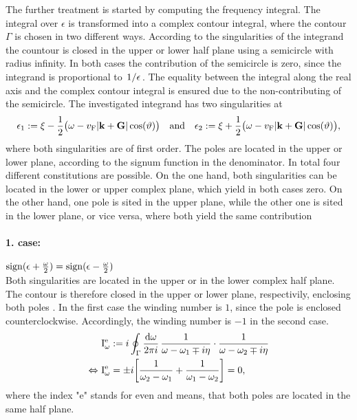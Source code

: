 The further treatment is started by computing the frequency integral.
The integral over $\epsilon$ is transformed into a complex contour integral, where the contour $\Gamma$ is chosen in two different ways.
According to the singularities of the integrand the countour is closed in the upper or lower half plane using a semicircle with radius infinity.
In both cases the contribution of the semicircle is zero, since the integrand is proportional to $\flatfrac{1}{\epsilon}$.
The equality between the integral along the real axis and the complex contour integral is ensured due to the non-contributing of the semicircle.
The investigated integrand has two singularities at
%
\begin{align}
	\epsilon_{1} := \xi - \frac{1}{2}\big(\omega - v_{\mt{F}} |\vb{k} + \vb{G}| \cos(\vartheta)\big) 
	\qq{and}
	\epsilon_{2} := \xi + \frac{1}{2}\big(\omega - v_{\mt{F}} |\vb{k} + \vb{G}| \cos(\vartheta)\big),
\end{align}
%
where both singularities are of first order.
The poles are located in the upper or lower plane, according to the signum function in the denominator.
In total four different constitutions are possible.
On the one hand, both singularities can be located in the lower or upper complex plane, which yield in both cases zero.
On the other hand, one pole is sited in the upper plane, while the other one is sited in the lower plane, or vice versa, where both yield the same contribution
%
\paragraph{1. case:} $\operatorname{sign}(\epsilon + \frac{\omega}{2}) = \operatorname{sign}(\epsilon - \frac{\omega}{2})$\\
%
Both singularities are located in the upper or in the lower complex half plane.
The contour is therefore closed in the upper or lower plane, respectivily, enclosing both poles .
In the first case the winding number is $1$, since the pole is enclosed counterclockwise.
Accordingly, the winding number is $-1$ in the second case.
%
\begin{align}
	&\mathrm{I}_{\omega}^{\mathrm{e}} := i \oint_{\Gamma} \frac{\dd{\omega}}{2\pi i}\, \frac{1}{\omega - \omega_{1} \mp i\eta} \cdot \frac{1}{\omega - \omega_{2} \mp i\eta}
	\notag \\
	\Leftrightarrow\ &\mathrm{I}_{\omega}^{\mathrm{e}} = \pm i \bigg[ \frac{1}{\omega_{2} - \omega_{1}} + \frac{1}{\omega_{1} - \omega_{2}}\bigg] = 0,
\end{align}
%
where the index "e" stands for even and means, that both poles are located in the same half plane.
%
